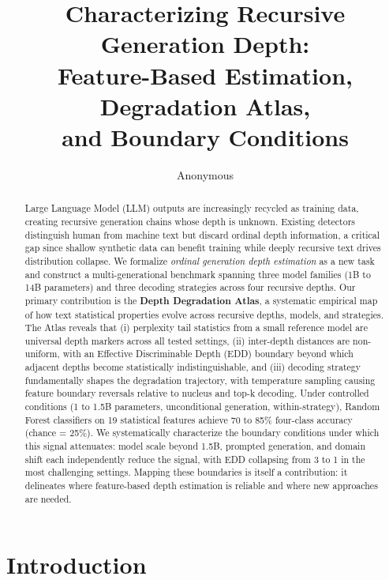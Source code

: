 \documentclass[11pt,a4paper]{article}
\title{Characterizing Recursive Generation Depth:\\Feature-Based Estimation, Degradation Atlas,\\and Boundary Conditions}
\author{Anonymous}
\date{}
\begin{document}
\maketitle

\begin{abstract}
Large Language Model (LLM) outputs are increasingly recycled as training data, creating recursive generation chains whose depth is unknown.
Existing detectors distinguish human from machine text but discard ordinal depth information, a critical gap since shallow synthetic data can benefit training while deeply recursive text drives distribution collapse.
We formalize \emph{ordinal generation depth estimation} as a new task and construct a multi-generational benchmark spanning three model families (1B to 14B parameters) and three decoding strategies across four recursive depths.
Our primary contribution is the \textbf{Depth Degradation Atlas}, a systematic empirical map of how text statistical properties evolve across recursive depths, models, and strategies.
The Atlas reveals that (i) perplexity tail statistics from a small reference model are universal depth markers across all tested settings, (ii) inter-depth distances are non-uniform, with an Effective Discriminable Depth (EDD) boundary beyond which adjacent depths become statistically indistinguishable, and (iii) decoding strategy fundamentally shapes the degradation trajectory, with temperature sampling causing feature boundary reversals relative to nucleus and top-k decoding.
Under controlled conditions (1 to 1.5B parameters, unconditional generation, within-strategy), Random Forest classifiers on 19 statistical features achieve 70 to 85\% four-class accuracy (chance = 25\%).
We systematically characterize the boundary conditions under which this signal attenuates: model scale beyond 1.5B, prompted generation, and domain shift each independently reduce the signal, with EDD collapsing from 3 to 1 in the most challenging settings.
Mapping these boundaries is itself a contribution: it delineates where feature-based depth estimation is reliable and where new approaches are needed.
\end{abstract}

\section{Introduction}
\label{sec:intro}
\end{document}
